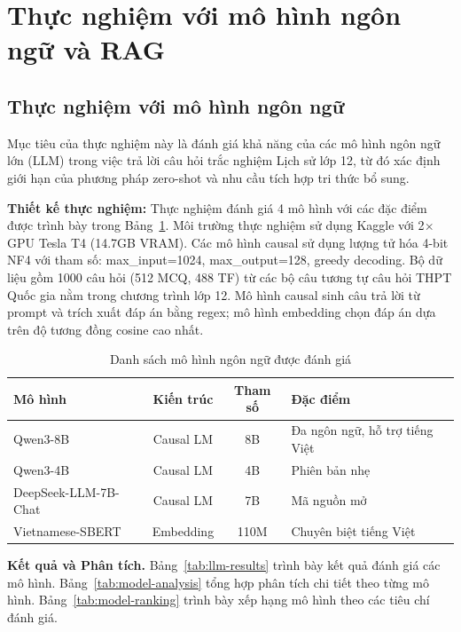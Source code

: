 \section{Thực nghiệm với mô hình ngôn ngữ và RAG}
\label{subsec:experiment_llm_rag}

\subsection{Thực nghiệm với mô hình ngôn ngữ}
Mục tiêu của thực nghiệm này là đánh giá khả năng của các mô hình ngôn ngữ lớn (LLM) trong việc trả lời câu hỏi trắc nghiệm Lịch sử lớp 12, từ đó xác định giới hạn của phương pháp zero-shot và nhu cầu tích hợp tri thức bổ sung.

\textbf{Thiết kế thực nghiệm:}
Thực nghiệm đánh giá 4 mô hình với các đặc điểm được trình bày trong Bảng~\ref{tab:llm-models}. Môi trường thực nghiệm sử dụng Kaggle với 2$\times$GPU Tesla T4 (14.7GB VRAM). Các mô hình causal sử dụng lượng tử hóa 4-bit NF4 với tham số: max\_input=1024, max\_output=128, greedy decoding. Bộ dữ liệu gồm 1000 câu hỏi (512 MCQ, 488 TF) từ các bộ câu tương tự câu hỏi THPT Quốc gia nằm trong chương trình lớp 12. Mô hình causal sinh câu trả lời từ prompt và trích xuất đáp án bằng regex; mô hình embedding chọn đáp án dựa trên độ tương đồng cosine cao nhất.

\begin{table}[H]
\centering
\caption{Danh sách mô hình ngôn ngữ được đánh giá}
\label{tab:llm-models}
\begin{tabular}{|l|c|c|l|}
\hline
\textbf{Mô hình} & \textbf{Kiến trúc} & \textbf{Tham số} & \textbf{Đặc điểm} \\
\hline
Qwen3-8B & Causal LM & 8B & Đa ngôn ngữ, hỗ trợ tiếng Việt \\
Qwen3-4B & Causal LM & 4B & Phiên bản nhẹ \\
DeepSeek-LLM-7B-Chat & Causal LM & 7B & Mã nguồn mở \\
Vietnamese-SBERT & Embedding & 110M & Chuyên biệt tiếng Việt \\
\hline
\end{tabular}
\end{table}

\textbf{Kết quả và Phân tích.}
Bảng~\ref{tab:llm-results} trình bày kết quả đánh giá các mô hình. Bảng~\ref{tab:model-analysis} tổng hợp phân tích chi tiết theo từng mô hình. Bảng~\ref{tab:model-ranking} trình bày xếp hạng mô hình theo các tiêu chí đánh giá.

